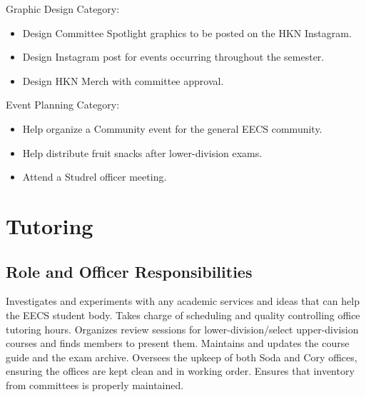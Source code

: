 \documentclass[11pt, article, oneside]{memoir}
\begin{document}
        \bigbreak

        Graphic Design Category:
        \begin{itemize}
            \item Design Committee Spotlight graphics to be posted on the HKN Instagram.
            \item Design Instagram post for events occurring throughout the semester.
            \item Design HKN Merch with committee approval.
        \end{itemize}

        Event Planning Category:
        \begin{itemize}
            \item Help organize a Community event for the general EECS community.
            \item Help distribute fruit snacks after lower-division exams.
            \item Attend a Studrel officer meeting.
        \end{itemize}

    \bigbreak

    \section{Tutoring}
    \subsection{Role and Officer Responsibilities}
    Investigates and experiments with any academic services and ideas that can help the EECS student body. Takes charge of scheduling and quality controlling office tutoring hours. Organizes review sessions for lower-division/select upper-division courses and finds members to present them. Maintains and updates the course guide and the exam archive. Oversees the upkeep of both Soda and Cory offices, ensuring the offices are kept clean and in working order. Ensures that inventory from committees is properly maintained.
\end{document}
